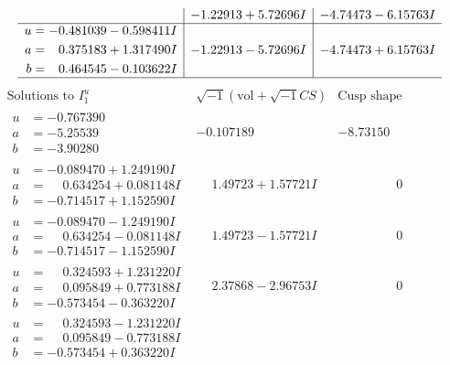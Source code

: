 \documentclass[1p]{elsarticle_modified}
\theoremstyle{definition}
\newcommand{\I}{\sqrt{-1}}
\begin{document}
$$\begin{array}{c|c|c}
 & -1.22913 + 5.72696 I & -4.74473 - 6.15763 I \\ \hline\begin{aligned}
u &= -0.481039 - 0.598411 I \\
a &= \phantom{-}0.375183 + 1.317490 I \\
b &= \phantom{-}0.464545 - 0.103622 I\end{aligned}
 & -1.22913 - 5.72696 I & -4.74473 + 6.15763 I\\
 \hline 
 \end{array}$$\newpage$$\begin{array}{c|c|c}  
\text{Solutions to }I^u_{1}& \I (\text{vol} + \sqrt{-1}CS) & \text{Cusp shape}\\
 \hline 
\begin{aligned}
u &= -0.767390\phantom{ +0.000000I} \\
a &= -5.25539\phantom{ +0.000000I} \\
b &= -3.90280\phantom{ +0.000000I}\end{aligned}
 & -0.107189\phantom{ +0.000000I} & -8.73150\phantom{ +0.000000I} \\ \hline\begin{aligned}
u &= -0.089470 + 1.249190 I \\
a &= \phantom{-}0.634254 + 0.081148 I \\
b &= -0.714517 + 1.152590 I\end{aligned}
 & \phantom{-}1.49723 + 1.57721 I & \phantom{-0.000000 } 0 \\ \hline\begin{aligned}
u &= -0.089470 - 1.249190 I \\
a &= \phantom{-}0.634254 - 0.081148 I \\
b &= -0.714517 - 1.152590 I\end{aligned}
 & \phantom{-}1.49723 - 1.57721 I & \phantom{-0.000000 } 0 \\ \hline\begin{aligned}
u &= \phantom{-}0.324593 + 1.231220 I \\
a &= \phantom{-}0.095849 + 0.773188 I \\
b &= -0.573454 - 0.363220 I\end{aligned}
 & \phantom{-}2.37868 - 2.96753 I & \phantom{-0.000000 } 0 \\ \hline\begin{aligned}
u &= \phantom{-}0.324593 - 1.231220 I \\
a &= \phantom{-}0.095849 - 0.773188 I \\
b &= -0.573454 + 0.363220 I\end{aligned}

\end{array}$$
\end{document}
